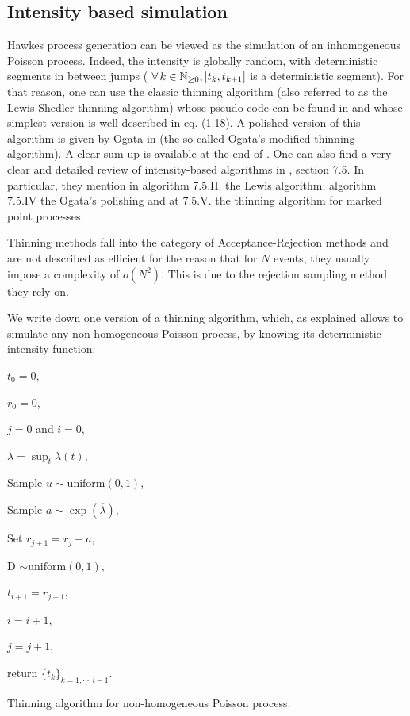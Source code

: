 \subsection{Intensity based simulation}
\label{subsection:thinning}
Hawkes process generation can be viewed as the simulation of an inhomogeneous Poisson process. Indeed, the intensity is globally random, with deterministic segments in between jumps ( $\forall k \in \N, ]t_k, t_{k+1}]$ is a deterministic segment). For that reason, one can use the classic thinning algorithm (also referred to as the Lewis-Shedler thinning algorithm) whose pseudo-code can be found in \cite{lewis} and whose simplest version is well described in \cite{socialhawkes} eq. (1.18). A polished version of this algorithm is given by Ogata in \cite{Ogata} (the so called Ogata's modified thinning algorithm). A clear sum-up is available at the end of \cite{simullaub}. One can also find a very clear and detailed review of intensity-based algorithms in \cite{daley}, section 7.5. In particular, they mention in algorithm 7.5.II. the Lewis algorithm; algorithm 7.5.IV the Ogata's polishing and at 7.5.V. the thinning algorithm for marked point processes.

Thinning methods fall into the category of Acceptance-Rejection methods and are not described as efficient for the reason that for $N$ events, they usually impose a complexity of $o(N^2)$. This is due to the rejection sampling method they rely on.


We write down one version of a thinning algorithm, which, as explained allows to simulate any non-homogeneous Poisson process, by knowing its deterministic intensity function:

\begin{algorithm}[H]
\label{algo:thinning_algo}
\SetAlgoLined
$t_0 = 0$,

$r_0 = 0$,

$j = 0$ and $i = 0$,

$\overline{ \lambda } = \sup_t \lambda( t ) $,

				{Sample $u \sim \text{uniform}(0,1)$, 
				
				Sample $a \sim \exp( \overline{ \lambda } )$,
				
				Set $r_{j+1} = r_j + a$,
				
				D $\sim \text{uniform}(0,1)$,
				
					{$t_{i+1} = r_{j+1}$,
				
					$i = i+1$,
					}
				$j = j+1$,
				}
{ return $\{t_k\}_{k = 1, \cdots, i-1}$. }


\caption{Thinning algorithm for non-homogeneous Poisson process.}
\end{algorithm}

